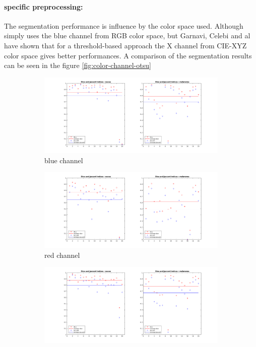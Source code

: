 \documentclass[a4paper,10pt]{article}
\begin{document}
\paragraph{specific preprocessing:}
The segmentation performance is influence by the color space used. Although~\cite{mendonca_comparison_2007} simply uses the blue channel from RGB color space, but 
Garnavi, Celebi and al~\cite{Garnavi2010} have shown that for a 
threshold-based approach the X channel from CIE-XYZ color space gives better performances. A comparison of the segmentation results can be seen in the figure \ref{fig:color-channel-otsu}

\begin{figure}
	
	\begin{subfigure}{0.7\textwidth}
		\includegraphics[width=0.9\linewidth]{../results/color-channel-influence/base-evaluation/otsu-dice-jaccard-B.png} 
		\caption{blue channel}
		\label{fig:otsu-blue}
	\end{subfigure}
	\begin{subfigure}{0.7\textwidth}
		\includegraphics[width=0.9\linewidth]{../results/color-channel-influence/base-evaluation/otsu-dice-jaccard-R.png}
		\caption{red channel}
		\label{fig:otsu-red}
	\end{subfigure}
	\begin{subfigure}{0.7\textwidth}
		\includegraphics[width=0.9\linewidth]{../results/color-channel-influence/base-evaluation/otsu-dice-jaccard-G.png}

\end{subfigure}
\end{figure}
\end{document}
